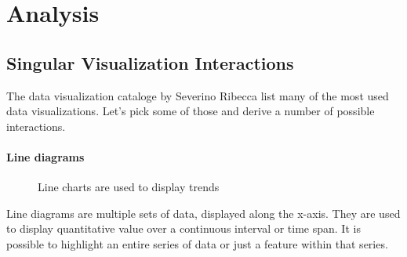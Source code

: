 \documentclass{article}
\begin{document}
\clearpage
\section{Analysis}\label{sec:analysis}

\subsection{Singular Visualization Interactions}\label{sec:analysis:examples}

The data visualization cataloge by Severino Ribecca list many of the most used data visualizations\cite{VisualizationCatalogue2017}.
Let's pick some of those and derive a number of possible interactions.



\paragraph{Line diagrams}
\begin{figure}
  \begin{center}
    \qquad
  \end{center}
  \caption{Line charts are used to display trends}\label{fig:concept:chart-types:line-diagrams}
\end{figure}

Line diagrams are multiple sets of data, displayed along the x-axis.
They are used to display quantitative value over a continuous interval or time span.
It is possible to highlight an entire series of data or just a feature within that series.
\end{document}
